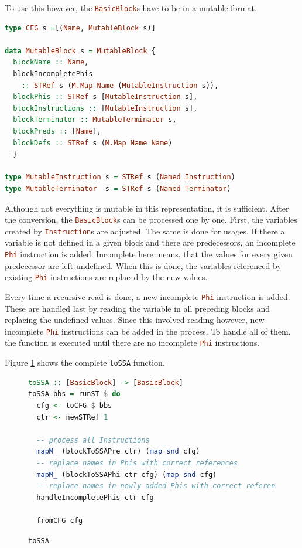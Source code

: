 \documentclass[a4paper,bibliography=totocnumbered,parskip,headsepline]{scrbook}
\begin{document}
To use this however, the \lstinline[language=haskell]!BasicBlock!s have to be in a mutable format.

\begin{lstlisting}[language=haskell]
type CFG s =[(Name, MutableBlock s)]

data MutableBlock s = MutableBlock {
  blockName :: Name,
  blockIncompletePhis
    :: STRef s (M.Map Name (MutableInstruction s)),
  blockPhis :: STRef s [MutableInstruction s],
  blockInstructions :: [MutableInstruction s],
  blockTerminator :: MutableTerminator s,
  blockPreds :: [Name],
  blockDefs :: STRef s (M.Map Name Name)
  }

type MutableInstruction s = STRef s (Named Instruction)
type MutableTerminator  s = STRef s (Named Terminator)
\end{lstlisting}

Although not everything is mutable in this representation, it is sufficient.
After the conversion, the \lstinline[language=haskell]!BasicBlock!s can be processed one by one.
First, the variables created by \lstinline[language=haskell]!Instruction!s are adjusted.
The same is done for usages.
If there a variable is not defined in a given block and there are predecessors, an incomplete \lstinline[language=haskell]!Phi! instruction is added.
Incomplete here means, that the values for every given predecessor are left undefined.
When this is done, the variables referenced by existing \lstinline[language=haskell]!Phi! instructions are replaced by the new values.

Every time a recursive read is done, a new incomplete \lstinline[language=haskell]!Phi! instruction is added.
These are handled last by reading the variable in all preceding blocks and replacing the undefined values.
Since this involved reading however, new incomplete \lstinline[language=haskell]!Phi! instructions can be added in the process.
To handle all of them, the function is executed until there are no incomplete \lstinline[language=haskell]!Phi! instructions.

Figure \ref{fig:tossa} shows the complete \lstinline[language=haskell]!toSSA! function.

\begin{figure}
\begin{lstlisting}[language=haskell]
toSSA :: [BasicBlock] -> [BasicBlock]
toSSA bbs = runST $ do
  cfg <- toCFG $ bbs
  ctr <- newSTRef 1

  -- process all Instructions
  mapM_ (blockToSSAPre ctr) (map snd cfg)
  -- replace names in Phis with correct references
  mapM_ (blockToSSAPhi ctr cfg) (map snd cfg)
  -- replace names in newly added Phis with correct references
  handleIncompletePhis ctr cfg

  fromCFG cfg
\end{lstlisting}
\caption{\lstinline[language=haskell]!toSSA!}
\label{fig:tossa}
\end{figure}
\end{document}
